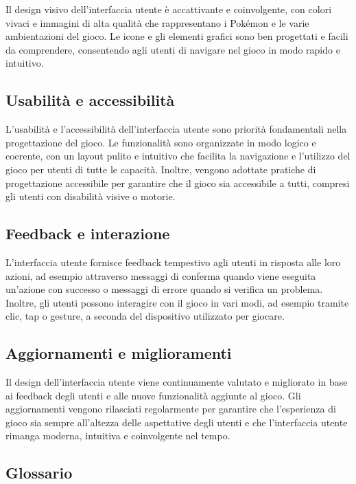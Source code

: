 \documentclass{article}
\begin{document}
Il design visivo dell'interfaccia utente è accattivante e coinvolgente, con colori vivaci e immagini di alta qualità che rappresentano i Pokémon e le varie ambientazioni del gioco. Le icone e gli elementi grafici sono ben progettati e facili da comprendere, consentendo agli utenti di navigare nel gioco in modo rapido e intuitivo.

\subsection{Usabilità e accessibilità}

L'usabilità e l'accessibilità dell'interfaccia utente sono priorità fondamentali nella progettazione del gioco. Le funzionalità sono organizzate in modo logico e coerente, con un layout pulito e intuitivo che facilita la navigazione e l'utilizzo del gioco per utenti di tutte le capacità. Inoltre, vengono adottate pratiche di progettazione accessibile per garantire che il gioco sia accessibile a tutti, compresi gli utenti con disabilità visive o motorie.

\subsection{Feedback e interazione}

L'interfaccia utente fornisce feedback tempestivo agli utenti in risposta alle loro azioni, ad esempio attraverso messaggi di conferma quando viene eseguita un'azione con successo o messaggi di errore quando si verifica un problema. Inoltre, gli utenti possono interagire con il gioco in vari modi, ad esempio tramite clic, tap o gesture, a seconda del dispositivo utilizzato per giocare.

\subsection{Aggiornamenti e miglioramenti}

Il design dell'interfaccia utente viene continuamente valutato e migliorato in base ai feedback degli utenti e alle nuove funzionalità aggiunte al gioco. Gli aggiornamenti vengono rilasciati regolarmente per garantire che l'esperienza di gioco sia sempre all'altezza delle aspettative degli utenti e che l'interfaccia utente rimanga moderna, intuitiva e coinvolgente nel tempo.

\subsection{Glossario}
\end{document}
